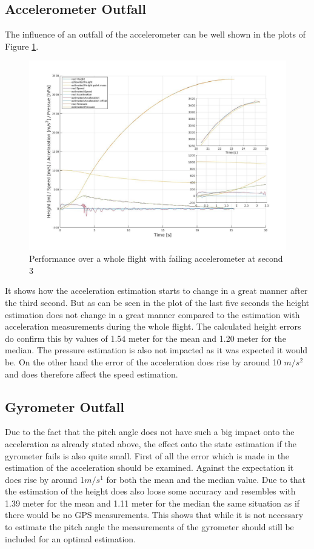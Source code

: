 \subsection{Accelerometer Outfall}
The influence of an outfall of the accelerometer can be well shown in the plots of Figure \ref{fig:PerformanceAccOutfall}.

\begin{figure}[h!]
 \centering
 \includegraphics[width=.8\textwidth]{./Pictures/BestSystemPerformanceAccOutfall.jpg}
 \caption{Performance over a whole flight with failing accelerometer at second 3}
 \label{fig:PerformanceAccOutfall}
\end{figure}

It shows how the acceleration estimation starts to change in a great manner after the third second.
But as can be seen in the plot of the last five seconds the height estimation does not change in a great manner
compared to the estimation with acceleration measurements during the whole flight.
The calculated height errors do confirm this by values of 1.54 meter for the mean and 1.20 meter for the median.
The pressure estimation is also not impacted as it was expected it would be.
On the other hand the error of the acceleration does rise by around 10 $m/s^2$ and does therefore affect the speed estimation.

\subsection{Gyrometer Outfall}
Due to the fact that the pitch angle does not have such a big impact onto the acceleration as already stated above,
the effect onto the state estimation if the gyrometer fails is also quite small.
First of all the error which is made in the estimation of the acceleration should be examined.
Against the expectation it does rise by around 1$m/s^1$ for both the mean and the median value.
Due to that the estimation of the height does also loose some accuracy and resembles with 1.39 meter for the mean
and 1.11 meter for the median the same situation as if there would be no GPS measurements.
This shows that while it is not necessary to estimate the pitch angle the measurements of the gyrometer should still be included for an optimal estimation.


